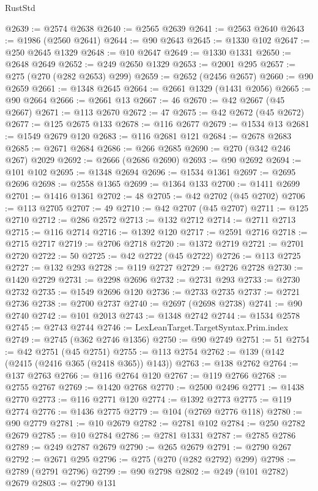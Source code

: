 \begin{lexlean}{RustStd}
\begin{coremodule}
@2639 := @2574 @2638
@2640 := @2565 @2639
@2641 := @2563 @2640
@2643 := @1986 (@2560 @2641)
@2644 := @90 @2643
@2645 := @1330 @102
@2647 := @250 @2645 @1329
@2648 := @10 @2647
@2649 := @1330 @1331
@2650 := @2648 @2649
@2652 := @249 @2650 @1329
@2653 := @2001 @295
@2657 := @275 (@270 (@282 @2653) @299)
@2659 := @2652 (@2456 @2657)
@2660 := @90 @2659
@2661 := @1348 @2645
@2664 := @2661 @1329 (@1431 @2056)
@2665 := @90 @2664
@2666 := @2661 @13
@2667 := 46
@2670 := @42 @2667 (@45 @2667)
@2671 := @113 @2670
@2672 := 47
@2675 := @42 @2672 (@45 @2672)
@2677 := @125 @2675 @133
@2678 := @116 @2677
@2679 := @1534 @13
@2681 := @1549 @2679 @120
@2683 := @116 @2681 @121
@2684 := @2678 @2683
@2685 := @2671 @2684
@2686 := @266 @2685
@2690 := @270 (@342 @246 @267) @2029
@2692 := @2666 (@2686 @2690)
@2693 := @90 @2692
@2694 := @101 @102
@2695 := @1348 @2694
@2696 := @1534 @1361
@2697 := @2695 @2696
@2698 := @2558 @1365
@2699 := @1364 @133
@2700 := @1411 @2699
@2701 := @1416 @1361
@2702 := 48
@2705 := @42 @2702 (@45 @2702)
@2706 := @113 @2705
@2707 := 49
@2710 := @42 @2707 (@45 @2707)
@2711 := @125 @2710
@2712 := @286 @2572
@2713 := @132 @2712
@2714 := @2711 @2713
@2715 := @116 @2714
@2716 := @1392 @120
@2717 := @2591 @2716
@2718 := @2715 @2717
@2719 := @2706 @2718
@2720 := @1372 @2719
@2721 := @2701 @2720
@2722 := 50
@2725 := @42 @2722 (@45 @2722)
@2726 := @113 @2725
@2727 := @132 @293
@2728 := @119 @2727
@2729 := @2726 @2728
@2730 := @1420 @2729
@2731 := @2298 @2696
@2732 := @2731 @293
@2733 := @2730 @2732
@2735 := @1549 @2696 @120
@2736 := @2733 @2735
@2737 := @2721 @2736
@2738 := @2700 @2737
@2740 := @2697 (@2698 @2738)
@2741 := @90 @2740
@2742 := @101 @2013
@2743 := @1348 @2742
@2744 := @1534 @2578
@2745 := @2743 @2744
@2746 := LexLeanTarget.TargetSyntax.Prim.index
@2749 := @2745 (@362 @2746 @1356)
@2750 := @90 @2749
@2751 := 51
@2754 := @42 @2751 (@45 @2751)
@2755 := @113 @2754
@2762 := @139 (@142 (@2415 (@2416 @365 (@2418 @365)) @143))
@2763 := @138 @2762
@2764 := @137 @2763
@2766 := @116 @2764 @120
@2767 := @119 @2766
@2768 := @2755 @2767
@2769 := @1420 @2768
@2770 := @2500 @2496
@2771 := @1438 @2770
@2773 := @116 @2771 @120
@2774 := @1392 @2773
@2775 := @119 @2774
@2776 := @1436 @2775
@2779 := @104 (@2769 @2776 @118)
@2780 := @90 @2779
@2781 := @10 @2679
@2782 := @2781 @102
@2784 := @250 @2782 @2679
@2785 := @10 @2784
@2786 := @2781 @1331
@2787 := @2785 @2786
@2789 := @249 @2787 @2679
@2790 := @265 @2679
@2791 := @2790 @267
@2792 := @2671 @295
@2796 := @275 (@270 (@282 @2792) @299)
@2798 := @2789 (@2791 @2796)
@2799 := @90 @2798
@2802 := @249 (@101 @2782) @2679
@2803 := @2790 @131

\end{coremodule}
\end{lexlean}
